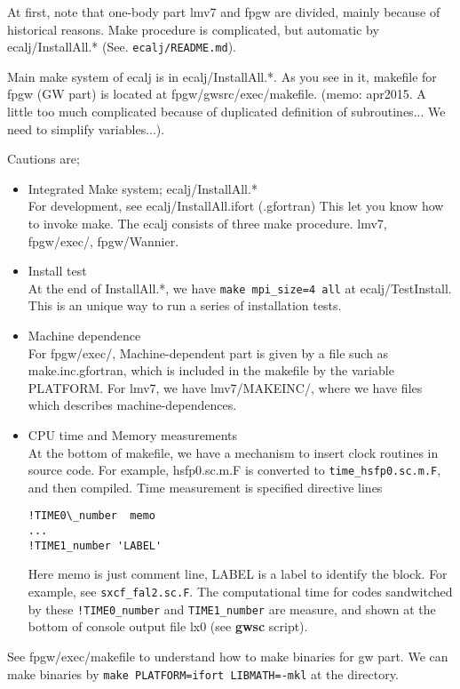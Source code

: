 \documentclass[a4paper,10pt,fleqn]{article}
\newcommand{\exe}[1]{{\bf #1}}
\newcommand{\io}[1]{{\sf  #1}}
\newcommand{\raw}[1]{{\tt #1}}
\begin{document}
At first, note that one-body part \io{lmv7} and \io{fpgw}
are divided, mainly because of historical reasons.
Make procedure is complicated, but automatic
by \io{ecalj/InstallAll.*} (See. \raw{ecalj/README.md}).

Main make system of ecalj is in ecalj/InstallAll.*.
As you see in it, makefile for fpgw (GW part) is 
located at \io{fpgw/gwsrc/exec/makefile}. 
(memo:
apr2015. A little too much complicated because of duplicated definition
of subroutines... We need to simplify variables...).

Cautions are;
\begin{itemize}
\item 
Integrated Make system; \io{ecalj/InstallAll.*}\\
For development, see ecalj/InstallAll.ifort (.gfortran)
This let you know how to invoke make.
The ecalj consists of three make procedure.
lmv7, fpgw/exec/, fpgw/Wannier.
\item Install test\\
At the end of \io{InstallAll.*}, we have \verb#make mpi_size=4 all# at
ecalj/TestInstall. This is an unique way to run 
a series of installation tests.
\item
Machine dependence\\
For fpgw/exec/, Machine-dependent part is given by
a file such as make.inc.gfortran, which is included
in the makefile by the variable PLATFORM.
For \io{lmv7}, we have \io{lmv7/MAKEINC/},
where we have files which describes machine-dependences. 

\item CPU time and Memory measurements\\
At the bottom of makefile, we have a mechanism
to insert clock routines in source code.
For example, hsfp0.sc.m.F is converted to
\verb#time_hsfp0.sc.m.F#, and then compiled.
Time measurement is specified directive lines 
\begin{verbatim}
!TIME0\_number  memo
...
!TIME1_number 'LABEL'
\end{verbatim}
Here memo is just comment line, LABEL is a label to identify the block.
For example, see \verb#sxcf_fal2.sc.F#. 
The computational time for codes sandwitched by these \verb#!TIME0_number# and
\verb#TIME1_number# are measure, and shown
at the bottom of console output file \io{lx0} (see \exe{gwsc} script).

\end{itemize}
See \io{fpgw/exec/makefile} to understand how to make binaries for gw part.
We can make binaries by \verb#make PLATFORM=ifort LIBMATH=-mkl# at the directory.\\
\end{document}
